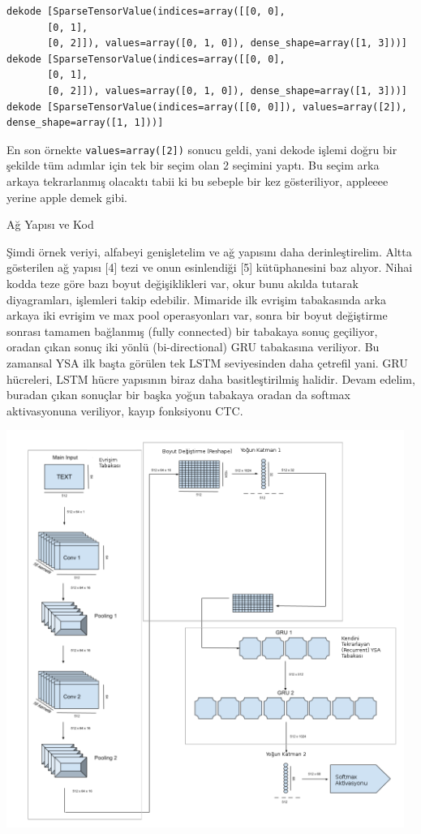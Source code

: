 \documentclass[12pt,fleqn]{article}\usepackage{../../common}
\begin{document}
\begin{verbatim}
dekode [SparseTensorValue(indices=array([[0, 0],
       [0, 1],
       [0, 2]]), values=array([0, 1, 0]), dense_shape=array([1, 3]))]
dekode [SparseTensorValue(indices=array([[0, 0],
       [0, 1],
       [0, 2]]), values=array([0, 1, 0]), dense_shape=array([1, 3]))]
dekode [SparseTensorValue(indices=array([[0, 0]]), values=array([2]), dense_shape=array([1, 1]))]
\end{verbatim}

En son örnekte \verb!values=array([2])! sonucu geldi, yani dekode işlemi
doğru bir şekilde tüm adımlar için tek bir seçim olan 2 seçimini yaptı. Bu
seçim arka arkaya tekrarlanmış olacaktı tabii ki bu sebeple bir kez
gösteriliyor, appleeee yerine apple demek gibi.

Ağ Yapısı ve Kod

Şimdi örnek veriyi, alfabeyi genişletelim ve ağ yapısını daha
derinleştirelim. Altta gösterilen ağ yapısı [4] tezi ve onun esinlendiği
[5] kütüphanesini baz alıyor. Nihai kodda teze göre bazı boyut
değişiklikleri var, okur bunu akılda tutarak diyagramları, işlemleri takip
edebilir. Mimaride ilk evrişim tabakasında arka arkaya iki evrişim ve max
pool operasyonları var, sonra bir boyut değiştirme sonrası tamamen
bağlanmış (fully connected) bir tabakaya sonuç geçiliyor, oradan çıkan
sonuç iki yönlü (bi-directional) GRU tabakasına veriliyor. Bu zamansal YSA
ilk başta görülen tek LSTM seviyesinden daha çetrefil yani. GRU hücreleri,
LSTM hücre yapısının biraz daha basitleştirilmiş halidir. Devam edelim,
buradan çıkan sonuçlar bir başka yoğun tabakaya oradan da softmax
aktivasyonuna veriliyor, kayıp fonksiyonu CTC.

\includegraphics[width=35em]{ocr_07.png}
\end{document}
